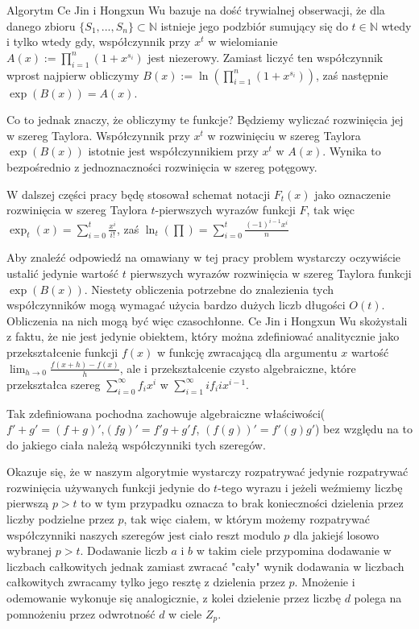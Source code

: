 \documentclass{article}
\begin{document}
Algorytm Ce Jin i Hongxun Wu bazuje na dość trywialnej obserwacji, że dla danego zbioru
$\{S_1,...,S_n\} \subset \mathbb{N}$ istnieje jego podzbiór sumujący się do $t \in \mathbb{N}$ wtedy 
i tylko wtedy gdy, współczynnik przy $x^t$ w  wielomianie $A(x) :=\prod_{i = 1}^{n}(1+x^{s_i})$ jest 
niezerowy. Zamiast liczyć ten współczynnik wprost najpierw obliczymy $B(x):=\ln(\prod_{i = 1}^{n}(1+x^{s_i}))$, 
zaś następnie $\exp(B(x)) = A(x)$. 

Co to jednak znaczy, że obliczymy te funkcje? Będziemy wyliczać rozwinięcia jej w szereg Taylora.
Współczynnik przy $x^t$ w rozwinięciu w szereg Taylora $\exp(B(x))$ istotnie jest współczynnikiem
przy $x^t$ w $A(x)$. Wynika to bezpośrednio z jednoznaczności rozwinięcia w szereg potęgowy. 

W dalszej części pracy będę stosował schemat notacji $F_t(x)$ jako oznaczenie rozwinięcia w szereg Taylora 
$t$-pierwszych wyrazów funkcji $F$, tak więc $\exp_t(x) = \sum_{i=0}^t\frac{x^i}{i!}$, zaś 
$\ln_t(\prod)=\sum_{i=0}^t\frac{(-1)^{i-1}x^i}{n}$ 

Aby znaleźć odpowiedź na omawiany w tej pracy problem wystarczy oczywiście ustalić jedynie 
wartość $t$ pierwszych wyrazów rozwinięcia w szereg Taylora funkcji $\exp(B(x))$. 
Niestety obliczenia potrzebne do znalezienia tych współczynników mogą wymagać użycia bardzo dużych liczb długości $O(t)$. 
Obliczenia na nich mogą być więc czasochłonne. Ce Jin i Hongxun Wu skożystali z faktu, że
nie jest jedynie obiektem, który można zdefiniować analitycznie jako przekształcenie funkcji 
$f(x)$ w funkcję zwracającą dla argumentu $x$ wartość $\lim_{h \to 0}\frac{f(x+h)-f(x)}{h}$, ale 
i przekształcenie czysto algebraiczne, które przekształca szereg $\sum_{i=0}^{\infty}f_i x^i$ w
$\sum_{i=1}^{\infty}if_{i}ix^{i-1}$. 

Tak zdefiniowana pochodna zachowuje algebraiczne właściwości($f'+g'=(f+g)'$,$(fg)'=f'g+g'f$,
$(f(g))'=f'(g)g'$) bez względu na to do jakiego ciała należą współczynniki tych szeregów. 

Okazuje się, że w naszym algorytmie wystarczy rozpatrywać jedynie rozpatrywać rozwinięcia używanych 
funkcji jedynie do $t$-tego wyrazu i jeżeli weźmiemy liczbę pierwszą $p>t$ to w tym przypadku
oznacza to brak konieczności dzielenia przez liczby podzielne przez $p$, tak więc ciałem, w 
którym możemy rozpatrywać współczynniki naszych szeregów jest ciało reszt modulo $p$ dla jakiejś losowo wybranej $p>t$. Dodawanie liczb $a$ i $b$ w takim ciele przypomina dodawanie w liczbach całkowitych jednak zamiast zwracać "cały" wynik dodawania w liczbach całkowitych
zwracamy tylko jego resztę z dzielenia przez $p$. Mnożenie i odemowanie wykonuje się 
analogicznie, z kolei dzielenie przez liczbę $d$ polega na pomnożeniu przez odwrotność
$d$ w ciele $Z_p$.
\end{document}
